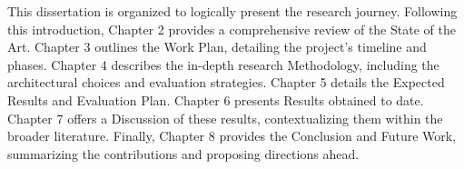 This dissertation is organized to logically present the research journey. Following this introduction, Chapter 2 provides a comprehensive review of the State of the Art. Chapter 3 outlines the Work Plan, detailing the project's timeline and phases. Chapter 4 describes the in-depth research Methodology, including the architectural choices and evaluation strategies. Chapter 5 details the Expected Results and Evaluation Plan. Chapter 6 presents Results obtained to date. Chapter 7 offers a Discussion of these results, contextualizing them within the broader literature. Finally, Chapter 8 provides the Conclusion and Future Work, summarizing the contributions and proposing directions ahead. 